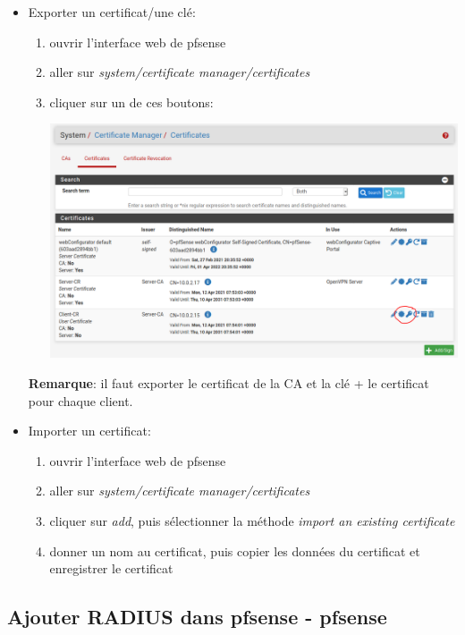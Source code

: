 \documentclass[a4paper]{article}
\begin{document}
\begin{itemize}
\item Exporter un certificat/une clé:
\begin{enumerate}
    \item ouvrir l'interface web de pfsense
    \item aller sur \textit{system/certificate manager/certificates}
    \item cliquer sur un de ces boutons:
    \begin{center}
        \includegraphics[width=0.99\linewidth]{images/CA-CR-export-01.PNG}
    \end{center}
\end{enumerate}
\textbf{Remarque}: il faut exporter le certificat de la CA et la clé + le certificat pour chaque client.


\item Importer un certificat:
\begin{enumerate}
    \item ouvrir l'interface web de pfsense
    \item aller sur \textit{system/certificate manager/certificates}
    \item cliquer sur \textit{add}, puis sélectionner la méthode \textit{import an existing certificate}
    \item donner un nom au certificat, puis copier les données du certificat et enregistrer le certificat
\end{enumerate}


\end{itemize}










\subsection{Ajouter RADIUS dans pfsense - pfsense}
\end{document}
